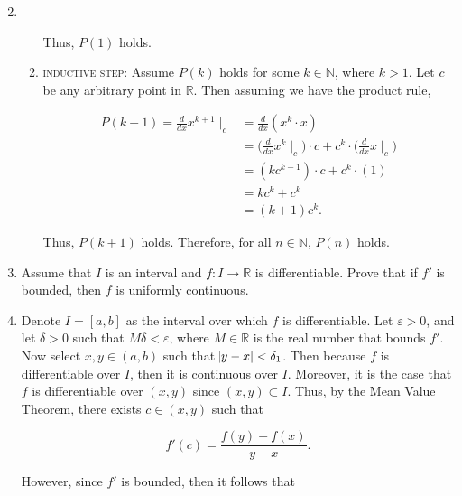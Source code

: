 \documentclass[12pt]{article}
\makeatletter
\theoremstyle{definition}
\theoremstyle{remark}
\renewenvironment{proof}[1][\proofname]{\par
  \pushQED{\qed}%
  \normalfont \topsep6\p@\@plus6\p@\relax
  \list{}{\leftmargin=0mm
          \rightmargin=0mm
          \settowidth{\itemindent}{\itshape#1}%
          \labelwidth=\itemindent
          \parsep=0pt \listparindent=\parindent 
  }
  \item[\hskip\labelsep
        \itshape
    #1\@addpunct{.}]\ignorespaces
}{%
  \popQED\endlist\@endpefalse
}
\let\oldproofname=\proofname
\renewcommand{\proofname}{\bf{\textit{\oldproofname}}}
\makeatother
\begin{document}
\begin{enumerate}[leftmargin=*]
\begin{proof}
\begin{enumerate}[label=(\roman*)]
            \noindent Thus, $P(1)$ holds.
            
            \item\textsc{inductive step:} Assume $P(k)$ holds for some $k\in\mathbb{N}$, where $k>1$. Let $c$ be any arbitrary point in $\mathbb{R}$. Then assuming we have the product rule, 
            
            \begin{equation*}
                \begin{split}
                    P(k+1)=\frac{d}{dx}x^{k+1}\mid_c &= \frac{d}{dx}(x^k\cdot x) \\
                    &= \bigg(\frac{d}{dx}x^k\mid_c\bigg)\cdot c+c^k\cdot\bigg(\frac{d}{dx}x\mid_c\bigg) \\
                    &= (kc^{k-1})\cdot c+c^k\cdot(1) \\
                    &= kc^k+c^k \\
                    &= (k+1)c^k.
                \end{split}
            \end{equation*}
            
            \noindent Thus, $P(k+1)$ holds. Therefore, for all $n\in\mathbb{N}$, $P(n)$ holds.
        \end{enumerate}
    \end{proof}
    
    \newpage
    
    \item Assume that $I$ is an interval and $f\colon I\rightarrow\mathbb{R}$ is differentiable. Prove that if $f'$ is bounded, then $f$ is uniformly continuous.
        
    \begin{proof}
        Denote $I=[a,b]$ as the interval over which $f$ is differentiable. Let $\varepsilon>0$, and let $\delta>0$ such that $M\delta<\varepsilon$, where $M\in\mathbb{R}$ is the real number that bounds $f'$. Now select $x,y\in (a,b)$ such that $\abs{y-x}<\delta_1$. Then because $f$ is differentiable over $I$, then it is continuous over $I$. Moreover, it is the case that $f$ is differentiable over $(x,y)$ since $(x,y)\subset I$. Thus, by the Mean Value Theorem, there exists $c\in(x,y)$ such that
        
        \begin{equation*}
            f'(c)=\frac{f(y)-f(x)}{y-x}.
        \end{equation*}
        
        \noindent However, since $f'$ is bounded, then it follows that
        

\end{proof}
\end{enumerate}
\end{document}
